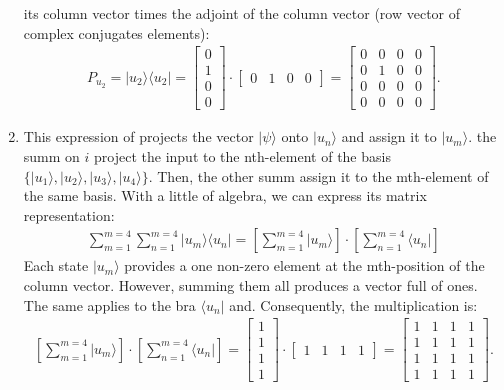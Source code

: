 \documentclass[letterpaper,11pt,twoside]{article}
\newcommand{\ket}[1]{|#1\rangle}
\newcommand{\bra}[1]{\langle#1|}
\begin{document}
\begin{enumerate}[itemsep=0pt,topsep=0pt,label=(\alph*)]
    its column vector times the adjoint of the column vector (row vector of complex conjugates elements):
    \begin{align*}
      P_{u_2}=\ket{u_2}\bra{u_2}=\begin{bmatrix}
        0\\1\\0\\0
      \end{bmatrix}\cdot\begin{bmatrix}
        0&1&0&0
      \end{bmatrix}=\begin{bmatrix}
        0&0&0&0\\
        0&1&0&0\\
        0&0&0&0\\
        0&0&0&0
      \end{bmatrix}.
    \end{align*}
    \item This expression of projects the vector $\ket{\psi}$ onto $\ket{u_n}$ and assign it to $\ket{u_m}$. the summ on $i$ project the input to the nth-element of the basis
    $\{\ket{u_1},\ket{u_2},\ket{u_3},\ket{u_4}\}$. Then, the other summ assign it to the mth-element of the same basis.
    With a little of algebra, we can express its matrix representation:
    \begin{align*}
      \sum_{m=1}^{m=4}\sum_{n=1}^{m=4}\ket{u_m}\bra{u_n}=\left[\sum_{m=1}^{m=4}\ket{u_m}\right]\cdot\left[\sum_{n=1}^{m=4}\bra{u_n}\right]
    \end{align*}
    Each state $\ket{u_m}$ provides a one non-zero element at the mth-position of the column vector. However, summing them all produces a vector full of ones.
    The same applies to the bra $\bra{u_n}$ and. Consequently, the multiplication is:
    \begin{align*}
      \left[\sum_{m=1}^{m=4}\ket{u_m}\right]\cdot\left[\sum_{n=1}^{m=4}\bra{u_n}\right]=\begin{bmatrix}
        1\\1\\1\\1
      \end{bmatrix}\cdot\begin{bmatrix}
        1&1&1&1
      \end{bmatrix}=\begin{bmatrix}
        1&1&1&1\\
        1&1&1&1\\
        1&1&1&1\\
        1&1&1&1
      \end{bmatrix}.
    \end{align*}
  \end{enumerate}
%
\end{document}
